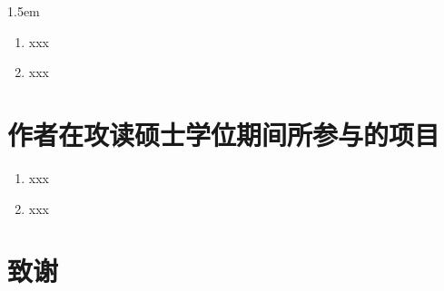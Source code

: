 \documentclass[UTF8]{ctexart}
\numberwithin{equation}{section} %
\numberwithin{table}{section} %
\begin{document}
\hangindent 1.5em
\noindent
\begin{enumerate}
    \item xxx
    \item xxx
\end{enumerate}


\pagebreak
\section*{作者在攻读硕士学位期间所参与的项目}

\begin{enumerate}
    \item xxx
    \item xxx
\end{enumerate}

\pagebreak
\section*{致谢}
\end{document}
